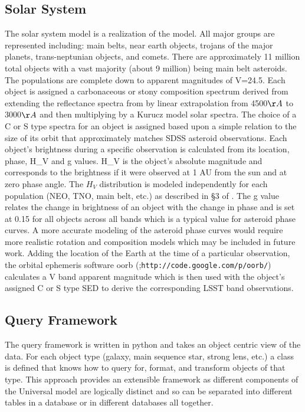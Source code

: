 \documentclass[]{article}
\begin{document}
{\subsection{Solar System \label{sec:ssm}}

The solar system model is a realization of the \citet{grav11} model.  All
major groups are represented including: main belts, near earth
objects, trojans of the major planets, trans-neptunian objects, and
comets. There are approximately 11 million total objects with a vast
majority (about 9 million) being main belt asteroids. The populations
are complete down to apparent magnitudes of V=24.5.  Each object is
assigned a carbonaceous or stony composition spectrum derived from
extending the reflectance spectra from \citet{demeo} by linear
extrapolation from 4500$\AA$ to 3000$\AA$ and then multiplying by a
Kurucz model solar spectra. The choice of a C or S type spectra for an
object is assigned based upon a simple relation to the size of its
orbit that approximately matches SDSS asteroid observations. Each
object's brightness during a specific observation is calculated from
its location, phase, H\_V and g values. H\_V is the object's absolute
magnitude and corresponds to the brightness if it were observed at 1
AU from the sun and at zero phase angle. 
The $H_V$ distribution is modeled independently for each population (NEO,
TNO, main belt, etc.) as described in \S 3 of \citet{grav11}.
The g value
relates the change in brightness of an object with the change in phase
and is set at 0.15 for all objects across all bands which is a typical
value for asteroid phase curves.  A more accurate modeling of the asteroid
phase curves would require more realistic rotation and composition models which 
may be included in future work.
Adding the location of the Earth at the time of a particular observation, the
orbital ephemeris software oorb (\citet{granvik};{\tt http://code.google.com/p/oorb/}) calculates a V band apparent magnitude
which is then used with the object's assigned C or S type SED to
derive the corresponding LSST band observations.

\subsection{Query Framework}
The query framework is written in python and takes an object centric view of the 
data.  For each object type (galaxy, main sequence star, strong lens, etc.) a class
is defined that knows how to query for, format, and transform objects of that type.  
This approach provides an extensible framework as different components of the Universal model
are logically distinct and so can be separated into different tables in a database
or in different databases all together.

}
\end{document}
